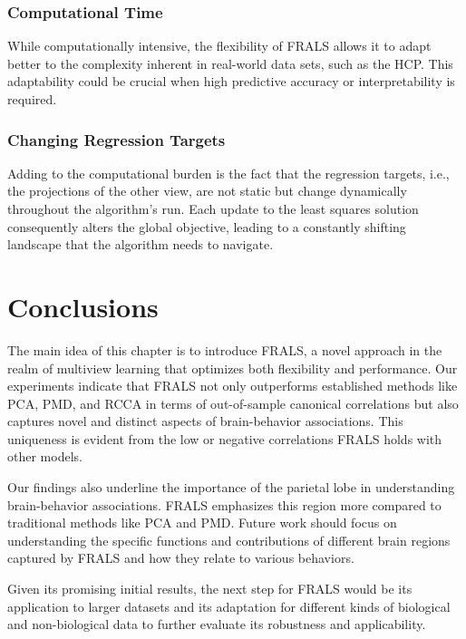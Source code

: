 \subsubsection{Computational Time}\label{subsec:computational-time}
While computationally intensive, the flexibility of FRALS allows it to adapt better to the complexity inherent in real-world data sets, such as the HCP. This adaptability could be crucial when high predictive accuracy or interpretability is required.

\subsubsection{Changing Regression Targets}\label{subsec:changing-regression-targets}
Adding to the computational burden is the fact that the regression targets, i.e., the projections of the other view, are not static but change dynamically throughout the algorithm's run.
Each update to the least squares solution consequently alters the global objective, leading to a constantly shifting landscape that the algorithm needs to navigate.

\section{Conclusions}
The main idea of this chapter is to introduce FRALS, a novel approach in the realm of multiview learning that optimizes
both flexibility and performance.
Our experiments indicate that FRALS not only outperforms established methods like PCA, PMD, and RCCA in terms of out-of-sample canonical correlations but also captures novel and distinct aspects of brain-behavior associations.
This uniqueness is evident from the low or negative correlations FRALS holds with other models.

Our findings also underline the importance of the parietal lobe in understanding brain-behavior associations.
FRALS emphasizes this region more compared to traditional methods like PCA and PMD. Future work should focus on understanding the specific functions and contributions of different brain regions captured by FRALS and how they relate to various behaviors.

Given its promising initial results, the next step for FRALS would be its application to larger datasets and its adaptation for different kinds of biological and non-biological data to further evaluate its robustness and applicability.



